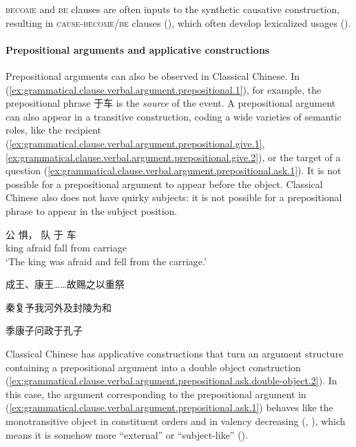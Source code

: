 \documentclass[UTF8, a4paper, oneside, scheme=plain, 12pt]{ctexrep}
\newcommand*{\term}[1]{\emph{#1}}
\newcommand{\translate}[1]{`#1'}
\newcommand*{\category}[1]{\textsc{#1}}
\begin{document}
\category{become} and \category{be} clauses are often inputs to the synthetic causative construction,
resulting in \category{cause}-\category{become}/\category{be} clauses
(),
which often develop lexicalized usages ().

\paragraph{Prepositional arguments and applicative constructions}\label{sec:grammatical.verbal.argument.prepositional}
Prepositional arguments can also be observed in Classical Chinese.
In (\ref{ex:grammatical.clause.verbal.argument.prepositional.1}),
for example, the prepositional phrase 于车 is the \term{source} of the event.
A prepositional argument can also appear in a transitive construction,
coding a wide varieties of semantic roles,
like the recipient (\ref{ex:grammatical.clause.verbal.argument.prepositional.give.1}, \ref{ex:grammatical.clause.verbal.argument.prepositional.give.2}),
or the target of a question (\ref{ex:grammatical.clause.verbal.argument.prepositional.ask.1}).
It is not possible for a prepositional argument to appear before the object.
Classical Chinese also does not have quirky subjects:
it is not possible for a prepositional phrase to appear in the subject position.

\begin{exe}
    \ex\label{ex:grammatical.clause.verbal.argument.prepositional.1} 
    \gll 公 惧， 队 于 车 \\
    king afraid fall from carriage \\
    \glt\translate{The king was afraid and fell from the carriage.}

    \ex\label{ex:grammatical.clause.verbal.argument.prepositional.give.1}  成王、康王……故赐之以重祭

    \ex\label{ex:grammatical.clause.verbal.argument.prepositional.give.2} 秦复予我河外及封陵为和

    \ex\label{ex:grammatical.clause.verbal.argument.prepositional.ask.1} 季康子问政于孔子
\end{exe}

Classical Chinese has applicative constructions that
turn an argument structure containing a prepositional argument into a double object construction
(\ref{ex:grammatical.clause.verbal.argument.prepositional.ask.double-object.2}).
In this case, the argument corresponding to the prepositional argument in (\ref{ex:grammatical.clause.verbal.argument.prepositional.ask.1})
behaves like the monotransitive object in constituent orders and in valency decreasing
(, ),
which means it is somehow more ``external'' or ``subject-like'' ().
\end{document}
